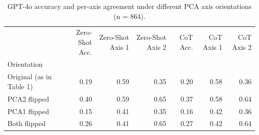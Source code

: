 \begin{table}
\caption{GPT-4o accuracy and per-axis agreement under different PCA axis orientations (n = 864).}
\label{tab:axis_orientation}
\begin{tabular}{lrrrrrr}
\toprule
 & Zero-Shot Acc. & Zero-Shot Axis 1 & Zero-Shot Axis 2 & CoT Acc. & CoT Axis 1 & CoT Axis 2 \\
Orientation &  &  &  &  &  &  \\
\midrule
Original (as in Table 1) & 0.19 & 0.59 & 0.35 & 0.20 & 0.58 & 0.36 \\
PCA2 flipped & 0.40 & 0.59 & 0.65 & 0.37 & 0.58 & 0.64 \\
PCA1 flipped & 0.15 & 0.41 & 0.35 & 0.16 & 0.42 & 0.36 \\
Both flipped & 0.26 & 0.41 & 0.65 & 0.27 & 0.42 & 0.64 \\
\bottomrule
\end{tabular}
\end{table}
